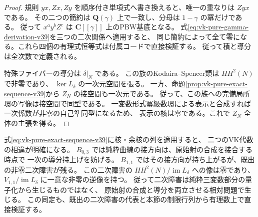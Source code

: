 \begin{proof}
規則 $yx,Zx,Zy$ を順序付き単項式へ書き換えると、唯一の重なりは $Zyx$ である。
その二つの簡約は $\mathbf Q(\gamma)$ 上で一致し、分母は $1-\gamma$ の冪だけである。
従って $x^ay^bZ^c$ は $\mathbf C[[\gamma]]$ 上のPBW基底となる。
式\eqref{eq:vk-pure-gamma-derivation-v39}を三つの二次関係へ適用すると、
同じ簡約によって全て零になる。これら四個の有理式恒等式は付属コードで直接検証する。
従って積と導分は全次数で定義される。

特殊ファイバーの導分は $\delta|_N$ である。
この族のKodaira--Spencer類は $HH^2(N)$ で非零であり、
$\ker L_\delta$ の一次元空間を張る。
一方、命題\ref{prop:vk-pure-exact-sequence-v39}から $Z_N$ の接空間も一次元である。
従って、この族への完備局所環の写像は接空間で同型である。
一変数形式冪級数環による表示と合成すれば一次係数が非零の自己準同型になるため、
表示の核は零である。これで $Z_N$ 全体の主張を得る。
\end{proof}

式\eqref{eq:vk-pure-exact-sequence-v39}に核・余核の列を適用すると、
二つのVK代数の相違が明確になる。
$B_{0,3}$ では純粋曲線の接方向は、原始射の合成を接合する時点で
一次の導分持上げを妨げる。
$B_{1,1}$ ではその接方向が持ち上がるが、既出の非零二次障害が残る。
この二次障害の $HH^2(N)/\operatorname{im}L_\delta$ への像は零であり、
$V_{1,1}/\operatorname{im}L_\delta$ に一意な非零の逆像を持つ。
従って二次障害は純粋三変数部分の量子化から生じるものではなく、
原始射の合成と導分を両立させる相対問題で生じる。
この同定も、既出の二次障害の代表と本節の制限行列から有理数上で直接検証する。

